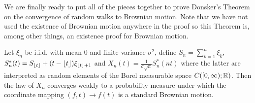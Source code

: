 We are finally ready to put all of the pieces together to prove
Donsker's Theorem on the convergence of random walks to Brownian
motion.  Note that we have not used the existence of Brownian motion
anywhere in the proof so this Theorem is, among other things, an
existence proof for Brownian motion.
\begin{thm}\label{Donsker2}Let $\xi_n$ be i.i.d. with mean $0$ and finite variance
  $\sigma^2$, define $S_n = \sum_{k=1}^n \xi_k$, $S_n^*(t) =
  S_{\left \lfloor t \right \rfloor} + (t - \left \lfloor t \right \rfloor)\xi_{\left \lfloor t \right \rfloor+1}$ and
  $X_n(t) = \frac{1}{\sigma \sqrt{n}} S_n^*(nt)$ where the latter are
  interpreted as random elements of the Borel measurable space
  $C([0,\infty);\mathbb{R})$.  
Then the law of $X_n$  converges weakly to a probability measure under
which the coordinate mapping $(f,t) \to f(t)$ is a standard Brownian motion.
\end{thm}
